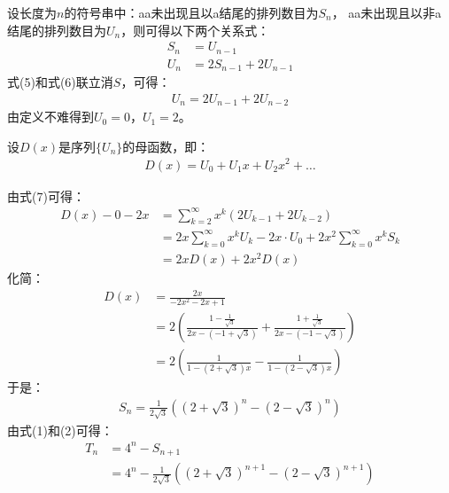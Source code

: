 \begin{solution}
    设长度为$n$的符号串中：aa未出现且以a结尾的排列数目为$S_n$，
    aa未出现且以非a结尾的排列数目为$U_n$，则可得以下两个关系式：
    \begin{align}
        S_n &= U_{n-1}\\
        U_n &= 2S_{n-1} + 2U_{n-1}
    \end{align}
    式(5)和式(6)联立消$S$，可得：
    \begin{align}
        U_{n}=2U_{n-1}+2U_{n-2}
    \end{align}
    由定义不难得到$U_0=0$，$U_1=2$。

    设$D(x)$是序列$\{U_n\}$的母函数，即：
    \begin{align*}
        D(x)=U_0+U_1x+U_2x^2+\ldots
    \end{align*}

    由式(7)可得：
    \begin{align*}
        D(x) - 0 - 2x &= \sum_{k=2}^\infty x^k(2U_{k-1}+2U_{k-2})\\
        &= 2x\sum_{k=0}^\infty x^kU_{k} - 2x\cdot U_0 + 2x^2\sum_{k=0}^\infty x^kS_{k}\\
        &= 2xD(x) + 2x^2D(x)
    \end{align*}
    化简：
    \begin{align*}
        D(x) &= \frac{2x}{-2x^2-2x+1}\\
        &= 2\left(\frac{1-\frac{1}{\sqrt{3}}}{2x-(-1+\sqrt{3})}+\frac{1+\frac{1}{\sqrt{3}}}{2x-(-1-\sqrt{3})}\right)\\
        &= 2\left(\frac{1}{1-(2+\sqrt{3})x}-\frac{1}{1-(2-\sqrt{3})x}\right)
    \end{align*}
    于是：
    \begin{align*}
        S_n = \frac{1}{2\sqrt{3}}\left((2+\sqrt{3})^n-(2-\sqrt{3})^n\right)
    \end{align*}
    由式(1)和(2)可得：
    \begin{align*}
        T_n &= 4^n - S_{n+1} \\
        &= 4^n - \frac{1}{2\sqrt{3}}\left((2+\sqrt{3})^{n+1}-(2-\sqrt{3})^{n+1}\right)
    \end{align*}
\end{solution}